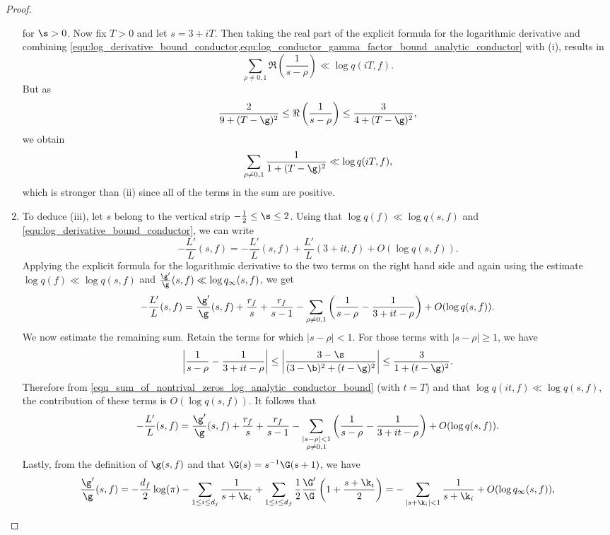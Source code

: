 \begin{proof}
\begin{enumerate}[label=(\roman*)]
      for $\s > 0$. Now fix $T > 0$ and let $s = 3+iT$. Then taking the real part of the explicit formula for the logarithmic derivative and combining \cref{equ:log_derivative_bound_conductor,equ:log_conductor_gamma_factor_bound_analytic_conductor} with (i), results in
      \[
        \sum_{\rho \neq 0,1}\Re\left(\frac{1}{s-\rho}\right) \ll \log{q(iT,f)}.
      \]
      But as
      \[
        \frac{2}{9+(T-\g)^{2}} \le \Re\left(\frac{1}{s-\rho}\right) \le \frac{3}{4+(T-\g)^{2}},
      \]
      we obtain
      \begin{equation}\label{equ_sum_of_nontrival_zeros_log_analytic_conductor_bound}
        \sum_{\rho \neq 0,1}\frac{1}{1+(T-\g)^{2}} \ll \log{q(iT,f)},
      \end{equation}
      which is stronger than (ii) since all of the terms in the sum are positive.
      \item To deduce (iii), let $s$ belong to the vertical strip $-\frac{1}{2} \le \s \le 2$. Using that $\log{q(f)} \ll \log{q(s,f)}$ and \cref{equ:log_derivative_bound_conductor}, we can write
      \[
        -\frac{L'}{L}(s,f) = -\frac{L'}{L}(s,f)+\frac{L'}{L}(3+it,f)+O(\log{q(s,f)}).
      \]
      Applying the explicit formula for the logarithmic derivative to the two terms on the right hand side and again using the estimate $\log{q(f)} \ll \log{q(s,f)}$ and $\frac{\g'}{\g}(s,f) \ll \log{q_{\infty}(s,f)}$, we get
      \[
        -\frac{L'}{L}(s,f) = \frac{\g'}{\g}(s,f)+\frac{r_{f}}{s}+\frac{r_{f}}{s-1}-\sum_{\rho \neq 0,1}\left(\frac{1}{s-\rho}-\frac{1}{3+it-\rho}\right)+O(\log{q(s,f)}).
      \]
      We now estimate the remaining sum. Retain the terms for which $|s-\rho| < 1$. For those terms with $|s-\rho| \ge 1$, we have
      \[
        \left|\frac{1}{s-\rho}-\frac{1}{3+it-\rho}\right| \le \left|\frac{3-\s}{(3-\b)^{2}+(t-\g)^{2}}\right| \le \frac{3}{1+(t-\g)^{2}}.
      \]
      Therefore from \cref{equ_sum_of_nontrival_zeros_log_analytic_conductor_bound} (with $t = T$) and that $\log{q(it,f)} \ll \log{q(s,f)}$, the contribution of these terms is $O(\log{q(s,f)})$. It follows that
      \[
        -\frac{L'}{L}(s,f) = \frac{\g'}{\g}(s,f)+\frac{r_{f}}{s}+\frac{r_{f}}{s-1}-\sum_{\substack{|s-\rho| < 1 \\ \rho \neq 0,1}}\left(\frac{1}{s-\rho}-\frac{1}{3+it-\rho}\right)+O(\log{q(s,f)}).
      \]
      Lastly, from the definition of $\g(s,f)$ and that $\G(s) = s^{-1}\G(s+1)$, we have
      \[
        \frac{\g'}{\g}(s,f) = -\frac{d_{f}}{2}\log(\pi)-\sum_{1 \le i \le d_{j}}\frac{1}{s+\k_{i}}+\sum_{1 \le i \le d_{f}}\frac{1}{2}\frac{\G'}{\G}\left(1+\frac{s+\k_{i}}{2}\right) = -\sum_{|s+\k_{i}| < 1}\frac{1}{s+\k_{i}}+O(\log{q_{\infty}(s,f)}),
\]
\end{enumerate}
\end{proof}
